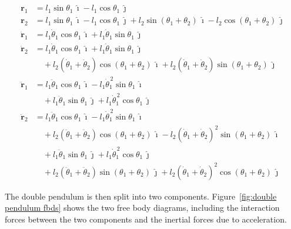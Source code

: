 \documentclass{article}
\begin{document}
\begin{align*}
    \mathbf r_1 &=
    l_1 \sin\theta_1\,\hat{\imath}
    - l_1 \cos\theta_1\,\hat{\jmath}
    \\[2mm]
    \mathbf r_2 &=
    l_1 \sin\theta_1\,\hat{\imath}
    - l_1 \cos\theta_1\,\hat{\jmath}
    + l_2 \sin(\theta_1+\theta_2)\,\hat{\imath}
    - l_2 \cos(\theta_1+\theta_2)\,\hat{\jmath}
    \\[4mm]
    \dot{\mathbf r}_1 &=
    l_1 \dot\theta_1 \cos\theta_1\,\hat{\imath}
    + l_1 \dot\theta_1 \sin\theta_1\,\hat{\jmath}
    \\[2mm]
    \dot{\mathbf r}_2 &=
    l_1 \dot\theta_1 \cos\theta_1\,\hat{\imath}
    + l_1 \dot\theta_1 \sin\theta_1\,\hat{\jmath}
    \\
    &\quad
    + l_2 (\dot\theta_1+\dot\theta_2)
    \cos(\theta_1+\theta_2)\,\hat{\imath}
    + l_2 (\dot\theta_1+\dot\theta_2)
    \sin(\theta_1+\theta_2)\,\hat{\jmath}
    \\[4mm]
    \ddot{\mathbf r}_1 &=
    l_1 \ddot\theta_1 \cos\theta_1\,\hat{\imath}
    - l_1 \dot\theta_1^{\,2} \sin\theta_1\,\hat{\imath}
    \\
    &\quad
    + l_1 \ddot\theta_1 \sin\theta_1\,\hat{\jmath}
    + l_1 \dot\theta_1^{\,2} \cos\theta_1\,\hat{\jmath}
    \\[4mm]
    \ddot{\mathbf r}_2 &=
    l_1 \ddot\theta_1 \cos\theta_1\,\hat{\imath}
    - l_1 \dot\theta_1^{\,2} \sin\theta_1\,\hat{\imath}
    \\
    &\quad
    + l_2 (\ddot\theta_1+\ddot\theta_2)
    \cos(\theta_1+\theta_2)\,\hat{\imath}
    - l_2 (\dot\theta_1+\dot\theta_2)^2
    \sin(\theta_1+\theta_2)\,\hat{\imath}
    \\
    &\quad
    + l_1 \ddot\theta_1 \sin\theta_1\,\hat{\jmath}
    + l_1 \dot\theta_1^{\,2} \cos\theta_1\,\hat{\jmath}
    \\
    &\quad
    + l_2 (\ddot\theta_1+\ddot\theta_2)
    \sin(\theta_1+\theta_2)\,\hat{\jmath}
    + l_2 (\dot\theta_1+\dot\theta_2)^2
    \cos(\theta_1+\theta_2)\,\hat{\jmath}
\end{align*}

The double pendulum is then split into two components. Figure~\ref{fig:double pendulum fbds} shows the two free body diagrams, including the interaction forces between the two components and the inertial forces due to acceleration.
\end{document}
